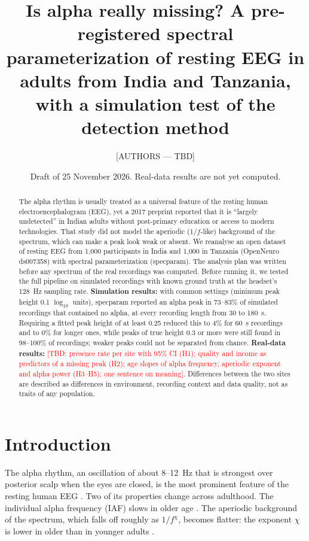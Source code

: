 \documentclass[11pt,a4paper]{article}
\title{Is alpha really missing? A pre-registered spectral parameterization of resting EEG
in adults from India and Tanzania, with a simulation test of the detection method}
\author{[AUTHORS --- TBD]}
\date{Draft of 25 November 2026. Real-data results are not yet computed.}
\newcommand{\TBD}[1]{\textcolor{red}{[TBD: #1]}}
\begin{document}
\maketitle

\begin{abstract}
\noindent
The alpha rhythm is usually treated as a universal feature of the resting human
electroencephalogram (EEG), yet a 2017 preprint reported that it is ``largely undetected''
in Indian adults without post-primary education or access to modern technologies. That
study did not model the aperiodic ($1/f$-like) background of the spectrum, which can make
a peak look weak or absent. We reanalyse an open dataset of resting EEG from 1,000
participants in India and 1,000 in Tanzania (OpenNeuro ds007358) with spectral
parameterization (specparam). The analysis plan was written before any spectrum of the
real recordings was computed. Before running it, we tested the full pipeline on simulated
recordings with known ground truth at the headset's 128~Hz sampling rate.
\textbf{Simulation results:} with common settings (minimum peak height 0.1 $\log_{10}$
units), specparam reported an alpha peak in 73--83\% of simulated recordings that contained
no alpha, at every recording length from 30 to 180~s. Requiring a fitted peak height of at
least 0.25 reduced this to 4\% for 60~s recordings and to 0\% for longer ones, while peaks
of true height 0.3 or more were still found in 98--100\% of recordings; weaker peaks could
not be separated from chance.
\textbf{Real-data results:} \TBD{presence rate per site with 95\% CI (H1); quality and
income as predictors of a missing peak (H2); age slopes of alpha frequency, aperiodic
exponent and alpha power (H3--H5); one sentence on meaning}. Differences between the two
sites are described as differences in environment, recording context and data quality,
not as traits of any population.
\end{abstract}

\section{Introduction}

The alpha rhythm, an oscillation of about 8--12~Hz that is strongest over posterior scalp
when the eyes are closed, is the most prominent feature of the resting human EEG
\citep{klimesch1999}. Two of its properties change across adulthood. The individual alpha
frequency (IAF) slows in older age \citep{klimesch1999,cesnaite2023,merkin2023}. The
aperiodic background of the spectrum, which falls off roughly as $1/f^{\chi}$, becomes
flatter: the exponent $\chi$ is lower in older than in younger adults
\citep{voytek2015,donoghue2020}.
\end{document}

